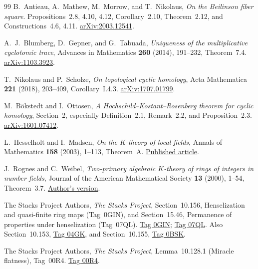 \documentclass[11pt,a4paper]{article}
\theoremstyle{remark}
\begin{document}
\begin{thebibliography}{99}
B.~Antieau, A.~Mathew, M.~Morrow, and T.~Nikolaus,
\emph{On the Beilinson fiber square}. Propositions~2.8, 4.10, 4.12,
Corollary~2.10, Theorem~2.12, and Constructions~4.6, 4.11.
\href{https://arxiv.org/abs/2003.12541}{arXiv:2003.12541}.

A.~J.~Blumberg, D.~Gepner, and G.~Tabuada,
\emph{Uniqueness of the multiplicative cyclotomic trace},
Advances in Mathematics \textbf{260} (2014), 191--232, Theorem~7.4.
\href{https://arxiv.org/abs/1103.3923}{arXiv:1103.3923}.

T.~Nikolaus and P.~Scholze, \emph{On topological cyclic homology},
Acta Mathematica \textbf{221} (2018), 203--409, Corollary~I.4.3.
\href{https://arxiv.org/abs/1707.01799}{arXiv:1707.01799}.

M.~B\"okstedt and I.~Ottosen,
\emph{A Hochschild--Kostant--Rosenberg theorem for cyclic homology},
Section~2, especially Definition~2.1, Remark~2.2, and Proposition~2.3.
\href{https://arxiv.org/abs/1601.07412}{arXiv:1601.07412}.

L.~Hesselholt and I.~Madsen, \emph{On the $K$-theory of local fields},
Annals of Mathematics \textbf{158} (2003), 1--113, Theorem~A.
\href{https://math.mit.edu/~larsh/papers/010/annals.pdf}{Published article}.

J.~Rognes and C.~Weibel, \emph{Two-primary algebraic $K$-theory of
rings of integers in number fields}, Journal of the American
Mathematical Society \textbf{13} (2000), 1--54, Theorem~3.7.
\href{https://sites.math.rutgers.edu/~weibel/archive/papers-dir/RognesWeibel.pdf}{Author's version}.

The Stacks Project Authors, \emph{The Stacks Project}, Section~10.156, Henselization and quasi-finite ring maps (Tag~0GIN), and Section~15.46, Permanence of properties under henselization (Tag~07QL).
\href{https://stacks.math.columbia.edu/tag/0GIN}{Tag 0GIN}; \href{https://stacks.math.columbia.edu/tag/07QL}{Tag 07QL}. Also Section~10.153, \href{https://stacks.math.columbia.edu/tag/04GK}{Tag 04GK}, and Section~10.155, \href{https://stacks.math.columbia.edu/tag/0BSK}{Tag 0BSK}.

The Stacks Project Authors, \emph{The Stacks Project}, Lemma~10.128.1 (Miracle flatness), Tag~00R4.
\href{https://stacks.math.columbia.edu/tag/00R4}{Tag 00R4}.


\end{thebibliography}
\end{document}
